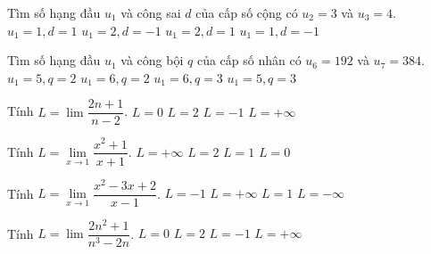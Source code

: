 \begin{ex}%
	Tìm số hạng đầu $u_1$ và công sai $d$ của cấp số cộng có $u_2=3$ và $u_3=4$.
	\choice
	{$u_1=1, d=1 $}
	{$u_1=2, d=-1 $}
	{\True $u_1=2, d=1 $}
	{$u_1=1, d=-1 $}
\end{ex}

\begin{ex}%
	Tìm số hạng đầu $u_1$ và công bội $q$ của cấp số nhân có $u_6=192$ và $u_7=384$.
	\choice
	{$u_1=5, q=2 $}
	{\True $u_1=6, q=2 $}
	{$u_1=6, q=3 $}
	{$u_1=5, q=3 $}
\end{ex}

\begin{ex}%
	Tính $L=\lim\limits\dfrac{2n+1}{n-2}$.
	\choice
	{$L=0 $}
	{\True $L=2 $}
	{$L=-1 $}
	{$L=+\infty $}
\end{ex}

\begin{ex}%
	Tính $L=\lim\limits_{x\to 1}\dfrac{x^2+1}{x+1}$.
	\choice
	{$L=+\infty $}
	{$L=2 $}
	{\True $L=1 $}
	{$L=0 $}
\end{ex}

\begin{ex}%
	Tính $L=\lim\limits_{x\to 1}\dfrac{x^2-3x+2}{x-1}$.
	\choice
	{\True $L=-1 $}
	{$L=+\infty $}
	{$L=1 $}
	{$L=-\infty $}
\end{ex}

\begin{ex}%
	Tính $L=\lim\limits\dfrac{2n^2+1}{n^3-2n}$.
	\choice
	{\True $L=0 $}
	{$L=2 $}
	{$L=-1 $}
	{$L=+\infty $}
\end{ex}

